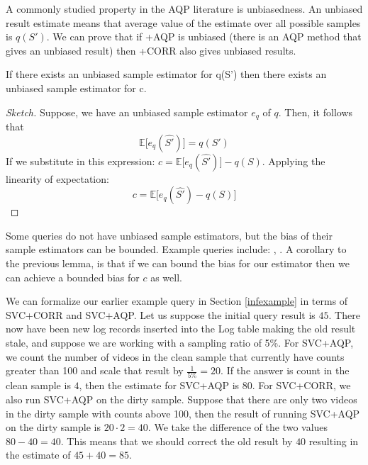 A commonly studied property in the AQP literature is unbiasedness.
An unbiased result estimate means that average value of the estimate over all possible samples is $q(S')$.
We can prove that if \svcnospace+AQP is unbiased (there is an AQP method that gives an unbiased result) then \svcnospace+CORR also gives unbiased results.
\begin{lemma}\label{lemma:unbiased}
If there exists an unbiased sample estimator for q(S') then there exists an unbiased sample estimator for c.
\end{lemma}
\begin{proof}[Sketch] 
Suppose, we have an unbiased sample estimator $e_q$ of $q$. 
Then, it follows that \[\mathbb{E}\big[e_q(\widehat{S'})\big] = q(S')\]
If we substitute in this expression:
$c = \mathbb{E}\big[e_q(\widehat{S'})\big] - q(S) $.
Applying the linearity of expectation:
\[ c = \mathbb{E}\big[e_q(\widehat{S'}) - q(S)\big] \]
\end{proof}
Some queries do not have unbiased sample estimators, but the bias of their sample estimators can be bounded. Example queries include: \medfunc, \percfunc.
A corollary to the previous lemma, is that if we can bound the bias for our estimator then we can achieve a bounded bias for $c$ as well.


\begin{example}
We can formalize our earlier example query in Section \ref{infexample} in terms of SVC+CORR and SVC+AQP.
Let us suppose the initial query result is $45$.
There now have been new log records inserted into the Log table making the old result stale, and suppose we are working with a sampling ratio of 5\%.
For SVC+AQP, we count the number of videos in the clean sample that currently have counts greater than 100 and scale that result by $\frac{1}{5\%} = 20$. 
If the answer is count in the clean sample is $4$, then the estimate for SVC+AQP is $80$.
For SVC+CORR, we also run SVC+AQP on the dirty sample.
Suppose that there are only two videos in the dirty sample with counts above 100, then the result of running SVC+AQP on the dirty sample is $20\cdot2 = 40$.
We take the difference of the two values $80 - 40 = 40$.
This means that we should correct the old result by $40$ resulting in the estimate of $45+40 = 85$.
\end{example}

